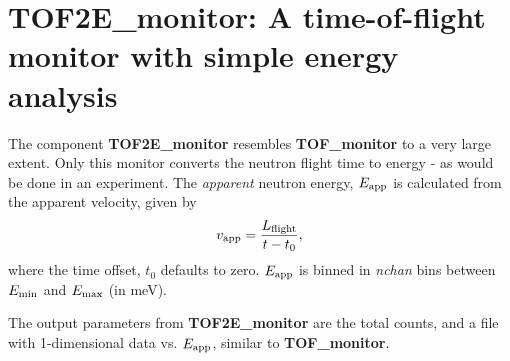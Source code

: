 \section{TOF2E\_monitor: A time-of-flight monitor with simple energy analysis} \label{s:TOF2E_monitor}

The component {\bf TOF2E\_monitor} resembles {\bf TOF\_monitor}
to a very large extent. Only this monitor converts the neutron flight
time to energy - as would be done in an experiment.
The {\em apparent} neutron energy, $E_{\rm app}$ is calculated 
from the apparent velocity, given by 
\begin{equation}
v_{\rm app} = \frac{L_{\rm flight}}{t-t_0} ,
\end{equation}
where the time offset, $t_0$ defaults to zero.
$E_{\rm app}$ is binned in \textit{nchan} bins between
$E_{\rm min}$ and $E_{\rm max}$ (in meV).

The output parameters from {\bf TOF2E\_monitor} are the total counts,
and a file with 1-dimensional data vs. $E_{\rm app}$, 
similar to {\bf TOF\_monitor}.


